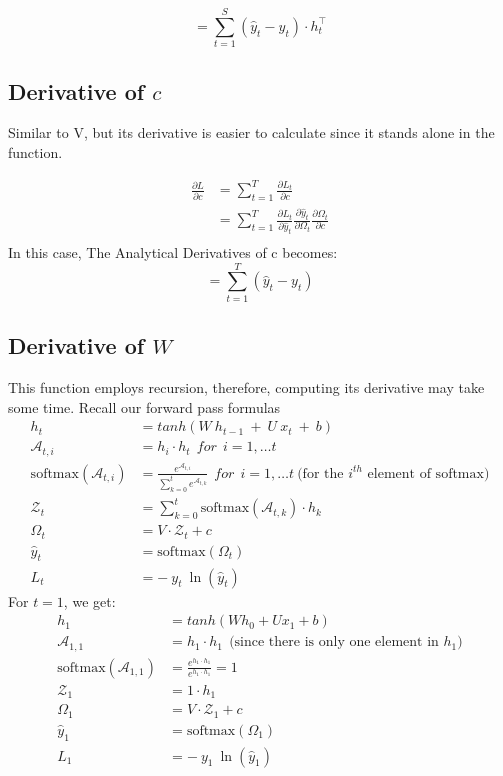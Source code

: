 \documentclass{article}
\begin{document}
\begin{equation}
\label{eqn:partial_aV}
=\sum_{t=1}^{S} (\hat{y}_{t} - y_{t}) \cdot h_{t}^\top
\end{equation}
\subsection{Derivative of $c$}
Similar to V, but its derivative is easier to calculate since it stands alone in the function.

\begin{align*}
\frac{\partial L}{\partial c} &= \sum_{t=1}^{T} \frac{\partial L_t}{\partial c} \\
&= \sum_{t=1}^{T} \frac{\partial L_{t}}{\partial \hat{y}_{t}} \frac{\partial \hat{y}_{t}}{\partial \Omega_{t}} \frac{\partial \Omega_{t}}{\partial c}\\
\end{align*}
In this case, The Analytical Derivatives of c becomes:
\begin{equation}
\label{eqn:partial_ac}
   =\sum_{t=1}^{T} (\hat{y}_{t} - y_{t})
\end{equation}

\subsection{Derivative of $W$}
This function employs recursion, therefore, computing its derivative may take some time. Recall our forward pass formulas
\begin{align*}
        h_t &= tanh(W ~h_{t-1}~+~U~x_t ~+~b)\\
	\mathcal{A}_{t,i} &= h_i  \cdot h_t~~for~~ i =1, \ldots t\\
\text{softmax}(\mathcal{A}_{t,i}) &= \frac{e^{\mathcal{A}_{t,i }}}{\sum_{k=0}^{t} e^{\mathcal{A}_{t,k}}} ~~for~~ i =1, \ldots t ~\text{(for the $i^{th}$ element of softmax)}\\
\mathcal{Z}_t &= \sum_{k=0}^{t}  \text{softmax}(\mathcal{A}_{t,k}) \cdot h_k \\
\Omega_t &= V \cdot \mathcal{Z}_t + c\\
\hat{y}_t &= \text{softmax}(\Omega_t)\\
        L_t &= -~y_t~\ln{(\hat{y}_t)}
\end{align*}
\newpage
For $t=1$, we get:
\begin{align*}
	h_1 &= tanh(W h_0 +Ux_1 +b)\\
 \mathcal{A}_{1,1} &= h_1 \cdot h_1  ~~\text{(since there is only one element in $h_1$)}\\
\text{softmax}(\mathcal{A}_{1,1}) &= \frac{e^{h_1 \cdot h_1 }}{ e^{h_1 \cdot h_1} } =1 \\
\mathcal{Z}_1 &= 1 \cdot h_1\\
\Omega_1 &= V \cdot \mathcal{Z}_1 + c\\
\hat{y}_1 &= \text{softmax}(\Omega_1)\\
        L_1 &= -~y_1~\ln{(\hat{y}_1)}
\end{align*}
\end{document}
